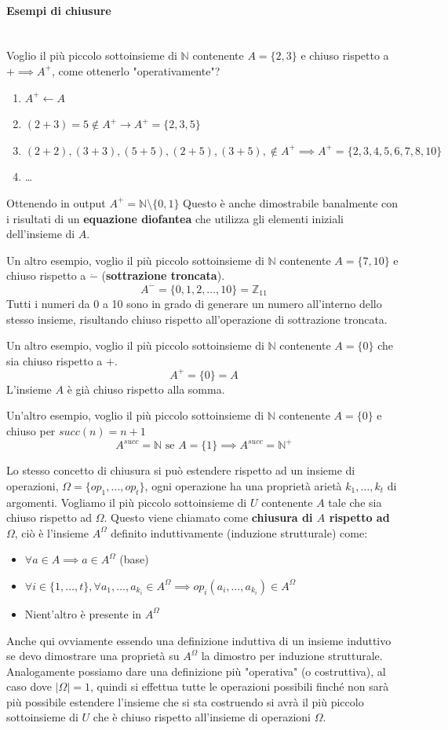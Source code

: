 \documentclass{article}
\begin{document}
\paragraph{Esempi di chiusure}\mbox{}\\
Voglio il più piccolo sottoinsieme di $\mathbb{N}$ contenente $A=\{2,3\}$ e chiuso rispetto
a $+\implies A^+$, come ottenerlo "operativamente"?
\begin{enumerate}
    \item $A^+\leftarrow A$
    \item $(2+3)=5 \notin A^+ \rightarrow A^+ =\{2,3,5\}$
    \item $(2+2),(3+3),(5+5),(2+5),(3+5), \notin A^+\implies A^+=\{2,3,4,5,6,7,8,10\}$
    \item \dots
\end{enumerate}
Ottenendo in output $A^+=\mathbb{N}\setminus\{0,1\}$
Questo è anche dimostrabile banalmente con i risultati di un \textbf{equazione diofantea}
che utilizza gli elementi iniziali dell'insieme di $A$.

Un altro esempio, voglio il più piccolo sottoinsieme di $\mathbb{N}$ contenente $A=\{7,10\}$
e chiuso rispetto a $\dot{-}$ (\textbf{sottrazione troncata}).
$$A^{\dot{-}}=\{0,1,2,\dots,10\}=\mathbb{Z}_{11}$$
Tutti i numeri da 0 a 10 sono in grado di generare un numero all'interno dello stesso
insieme, risultando chiuso rispetto all'operazione di sottrazione troncata.

Un altro esempio, voglio il più piccolo sottoinsieme di $\mathbb{N}$ contenente $A=\{0\}$
che sia chiuso rispetto a $+$.
$$A^+=\{0\}=A$$
L'insieme $A$ è già chiuso rispetto alla somma.

Un'altro esempio, voglio il più piccolo sottoinsieme di $\mathbb{N}$ contenente $A=\{0\}$
e chiuso per $succ(n)=n+1$
$$A^{succ}=\mathbb{N}\text{ se }A=\{1\}\implies A^{succ}=\mathbb{N}^+$$

Lo stesso concetto di chiusura si può estendere rispetto ad un insieme di operazioni, $\Omega=\{op_1,\dots,op_t\}$,
ogni operazione ha una proprietà arietà $k_1,\dots,k_t$ di argomenti. Vogliamo il
più piccolo sottoinsieme di $U$ contenente $A$ tale che sia chiuso rispetto ad $\Omega$. Questo
viene chiamato come \textbf{chiusura di $A$ rispetto ad $\Omega$}, ciò è l'insieme $A^\Omega$
definito induttivamente (induzione strutturale) come:
\begin{itemize}
    \item $\forall a\in A\implies a\in A^\Omega$ (base)
    \item $\forall i\in\{1,\dots,t\}, \forall a_1,\dots,a_{k_i}\in A^\Omega \implies op_i(a_i,\dots,a_{k_i})\in A^\Omega$
    \item Nient'altro è presente in $A^\Omega$
\end{itemize}
Anche qui ovviamente essendo una definizione induttiva di un insieme induttivo se devo dimostrare
una proprietà su $A^\Omega$ la dimostro per induzione strutturale.
Analogamente possiamo dare una definizione più "operativa" (o costruttiva), al caso
dove $|\Omega|=1$, quindi si effettua tutte le operazioni possibili finché non sarà più
possibile estendere l'insieme che si sta costruendo si avrà il più piccolo sottoinsieme di
$U$ che è chiuso rispetto all'insieme di operazioni $\Omega$.
\end{document}
